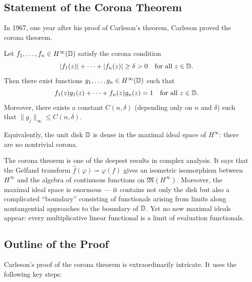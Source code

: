 \subsection{Statement of the Corona Theorem}

In 1967, one year after his proof of Carleson's theorem, Carleson proved the corona theorem.

\begin{theorem}
Let \(f_1, \dots, f_n \in H^\infty(\mathbb{D})\) satisfy the corona condition
\[
|f_1(z)| + \cdots + |f_n(z)| \geq \delta > 0 \quad \text{for all } z \in \mathbb{D}.
\]
Then there exist functions \(g_1, \dots, g_n \in H^\infty(\mathbb{D})\) such that
\[
f_1(z) g_1(z) + \cdots + f_n(z) g_n(z) = 1 \quad \text{for all } z \in \mathbb{D}.
\]
Moreover, there exists a constant \(C(n, \delta)\) (depending only on \(n\) and \(\delta\)) such that \(\|g_j\|_\infty \leq C(n, \delta)\).

Equivalently, the unit disk \(\mathbb{D}\) is dense in the maximal ideal space of \(H^\infty\): there are no nontrivial corona.
\end{theorem}

The corona theorem is one of the deepest results in complex analysis. It says that the Gelfand transform \(\widehat{f}(\varphi) = \varphi(f)\) gives an isometric isomorphism between \(H^\infty\) and the algebra of continuous functions on \(\mathfrak{M}(H^\infty)\). Moreover, the maximal ideal space is enormous --- it contains not only the disk but also a complicated ``boundary'' consisting of functionals arising from limits along nontangential approaches to the boundary of \(\mathbb{D}\). Yet no new maximal ideals appear: every multiplicative linear functional is a limit of evaluation functionals.

\subsection{Outline of the Proof}

Carleson's proof of the corona theorem is extraordinarily intricate. It uses the following key steps:

